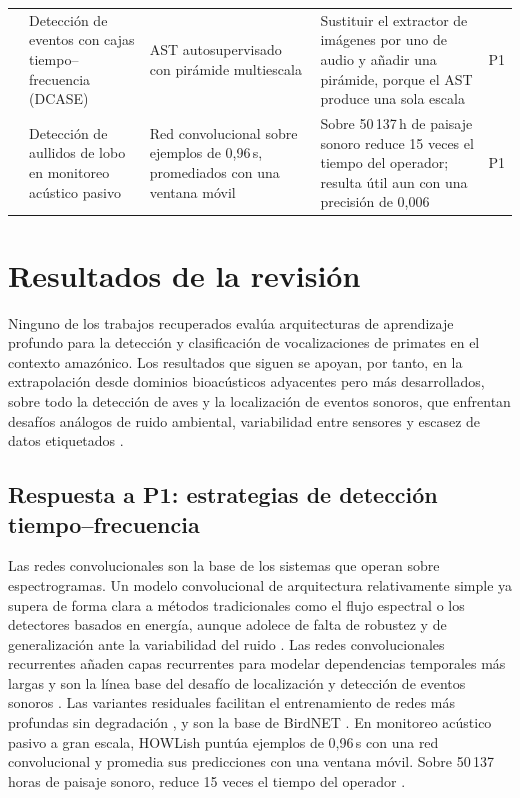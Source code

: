 \begin{table}[htbp]
\begin{tabular}{@{}L{2.6cm}L{2.8cm}L{2.9cm}L{4.4cm}L{1.2cm}@{}}
        \addlinespace
        \citet{zhu_sound_2025} & Detección de eventos con cajas tiempo--frecuencia (DCASE) & AST autosupervisado con pirámide multiescala & Sustituir el extractor de imágenes por uno de audio y añadir una pirámide, porque el AST produce una sola escala & P1 \\
        \addlinespace
        \citet{Campos_Krofel_Rio-Maior_Renna_2025} & Detección de aullidos de lobo en monitoreo acústico pasivo & Red convolucional sobre ejemplos de 0,96\,s, promediados con una ventana móvil & Sobre 50\,137\,h de paisaje sonoro reduce 15 veces el tiempo del operador; resulta útil aun con una precisión de 0,006 & P1 \\
        \bottomrule
    \end{tabular}
\end{table}

\section{Resultados de la revisión}
\label{sec:resultados-revision}

Ninguno de los trabajos recuperados evalúa arquitecturas de aprendizaje profundo
para la detección y clasificación de vocalizaciones de primates en el contexto
amazónico. Los resultados que siguen se apoyan, por tanto, en la extrapolación
desde dominios bioacústicos adyacentes pero más desarrollados, sobre todo la
detección de aves y la localización de eventos sonoros, que enfrentan
desafíos análogos de ruido ambiental, variabilidad entre sensores y escasez de
datos etiquetados \citep{lostanlen_robust_2019,nolasco_learning_2023}.

\subsection{Respuesta a P1: estrategias de detección tiempo--frecuencia}

Las redes convolucionales son la base de los sistemas que operan sobre
espectrogramas. Un modelo convolucional de arquitectura relativamente simple ya
supera de forma clara a métodos tradicionales como el flujo espectral o los
detectores basados en energía, aunque adolece de falta de robustez y de
generalización ante la variabilidad del ruido \citep{lostanlen_robust_2019}. Las
redes convolucionales recurrentes añaden capas recurrentes para modelar
dependencias temporales más largas y son la línea base del desafío de
localización y detección de eventos sonoros \citep{politis_dataset_2020}. Las variantes residuales facilitan el
entrenamiento de redes más profundas sin degradación \citep{he_deep_2016}, y son
la base de BirdNET \citep{kahl_birdnet_2021}. En monitoreo acústico pasivo a gran
escala, HOWLish puntúa ejemplos de 0,96\,s con una red convolucional y promedia
sus predicciones con una ventana móvil. Sobre 50\,137 horas de paisaje sonoro,
reduce 15 veces el tiempo del operador \citep{Campos_Krofel_Rio-Maior_Renna_2025}.

